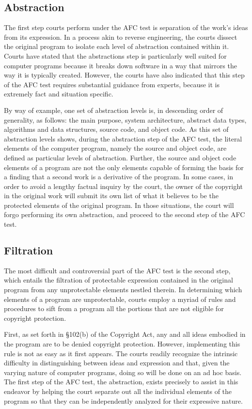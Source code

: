 \documentclass[11pt, letterpaper]{book}
\begin{document}
\subsection{Abstraction}

The first step courts perform under the AFC test is separation of the
work's ideas from its expression. In a process akin to reverse
engineering, the courts dissect the original program to isolate each level
of abstraction contained within it. Courts have stated that the
abstractions step is particularly well suited for computer programs
because it breaks down software in a way that mirrors the way it is
typically created. However, the courts have also indicated that this step
of the AFC test requires substantial guidance from experts, because it is
extremely fact and situation specific.

By way of example, one set of abstraction levels is, in descending order
of generality, as follows: the main purpose, system architecture, abstract
data types, algorithms and data structures, source code, and object
code. As this set of abstraction levels shows, during the abstraction step
of the AFC test, the literal elements of the computer program, namely the
source and object code, are defined as particular levels of
abstraction. Further, the source and object code elements of a program are
not the only elements capable of forming the basis for a finding that a
second work is a derivative of the program. In some cases, in order to
avoid a lengthy factual inquiry by the court, the owner of the copyright in
the original work will submit its own list of what it believes to be the
protected elements of the original program. In those situations, the court
will forgo performing its own abstraction, and proceed to the second step of
the AFC test.

\subsection{Filtration}

The most difficult and controversial part of the AFC test is the second
step, which entails the filtration of protectable expression contained in
the original program from any unprotectable elements nestled therein. In
determining which elements of a program are unprotectable, courts employ a
myriad of rules and procedures to sift from a program all the portions
that are not eligible for copyright protection.

First, as set forth in \S 102(b) of the Copyright Act, any and all ideas
embodied in the program are to be denied copyright protection. However,
implementing this rule is not as easy as it first appears. The courts
readily recognize the intrinsic difficulty in distinguishing between ideas
and expression and that, given the varying nature of computer programs,
doing so will be done on an ad hoc basis. The first step of the AFC test,
the abstraction, exists precisely to assist in this endeavor by helping
the court separate out all the individual elements of the program so that
they can be independently analyzed for their expressive nature.
\end{document}
